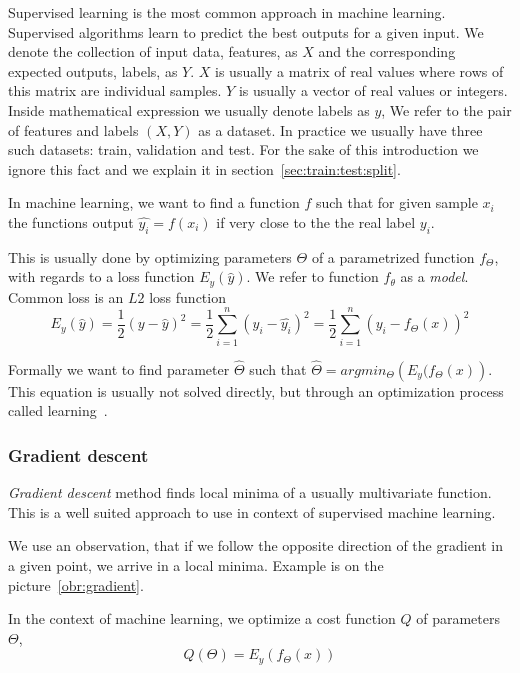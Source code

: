     Supervised learning is the most common approach in machine learning. 
    Supervised algorithms learn to predict the best outputs for a given input.
    We denote the collection of input data, features, as $X$ and the corresponding expected outputs, labels, as $Y$.
    $X$ is usually a matrix of real values where rows of this matrix are individual samples.
    $Y$ is usually a vector of real values or integers. 
    Inside mathematical expression we usually denote labels as $y$,
    We refer to the pair of features and labels $(X, Y)$ as a dataset.
    In practice we usually have three such datasets: train, validation and test. 
    For the sake of this introduction we ignore this fact and we explain it in section~\ref{sec:train:test:split}.
    
    In machine learning, we want to find a function $f$ such that for given sample $x_i$
    the functions output $\hat{y_i} = f(x_i)$ if very close to the the real label $y_i$.
    
    This is usually done by optimizing parameters $\Theta$ of a parametrized function $f_\Theta$,
    with regards to a loss function $E_y(\hat{y})$. 
    We refer to function $f_\theta$ as a \textit{model}.
    Common loss is an $L2$ loss function 
    $$E_y(\hat{y}) = \frac{1}{2}(y - \hat{y})^2 = \frac{1}{2}\sum_{i=1}^n (y_i - \hat{y_i})^2= \frac{1}{2}\sum_{i=1}^n (y_i - f_\Theta(x))^2$$  
    
    Formally we want to find parameter $\hat{\Theta}$ such that $\hat{\Theta} = argmin_\Theta \left(E_y(f_\Theta(x) \right)$. 
    This equation is usually not solved directly, but through an optimization process called learning~\cite{Goodfellow-et-al-2016}. %
    
    \subsubsection{Gradient descent}

    \textit{Gradient descent} method finds local minima of a usually multivariate function. 
    This is a well suited approach to use in context of supervised machine learning. 
    
    We use an observation, that if we follow the opposite direction of the gradient in a given point, 
    we arrive in a local minima. Example is on the picture~\ref{obr:gradient}.
    
    In the context of machine learning, we optimize a cost function $Q$ of parameters $\Theta$, 
    $$Q(\Theta) = E_y(f_\Theta(x))$$
    
